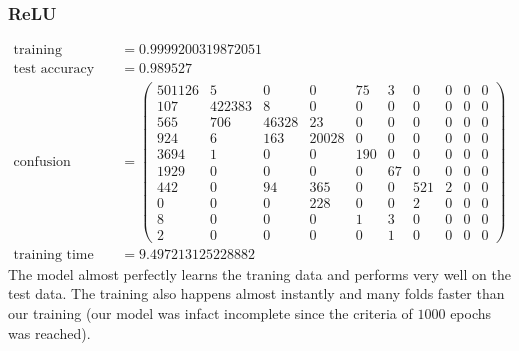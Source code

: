 \documentclass[11pt]{article}
\begin{document}
\subsubsection{ReLU}
\begin{equation}
  \begin{split}
    \text{training accuracy} &= 0.9999200319872051\\
    \text{test accuracy} &= 0.989527\\
    \text{confusion matrix} &=
    \begin{pmatrix}
      501126 & 5      & 0     & 0     & 75  & 3  & 0   & 0 & 0 & 0 \\
      107    & 422383 & 8     & 0     & 0   & 0  & 0   & 0 & 0 & 0 \\
      565    & 706    & 46328 & 23    & 0   & 0  & 0   & 0 & 0 & 0 \\
      924    & 6      & 163   & 20028 & 0   & 0  & 0   & 0 & 0 & 0 \\
      3694   & 1      & 0     & 0     & 190 & 0  & 0   & 0 & 0 & 0 \\
      1929   & 0      & 0     & 0     & 0   & 67 & 0   & 0 & 0 & 0 \\
      442    & 0      & 94    & 365   & 0   & 0  & 521 & 2 & 0 & 0 \\
      0      & 0      & 0     & 228   & 0   & 0  & 2   & 0 & 0 & 0 \\
      8      & 0      & 0     & 0     & 1   & 3  & 0   & 0 & 0 & 0 \\
      2      & 0      & 0     & 0     & 0   & 1  & 0   & 0 & 0 & 0
    \end{pmatrix}\\
    \text{training time} &= 9.497213125228882
  \end{split}
\end{equation}
The model almost perfectly learns the traning data and performs very well on the test data. The training also happens almost instantly and many folds faster than our training (our model was infact incomplete since the criteria of $1000$ epochs was reached).
\end{document}
